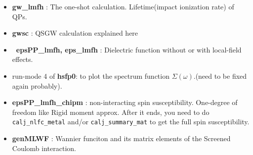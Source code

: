 {\begin{itemize}
\item
{\bf gw\_lmfh} : The one-shot \GW calculation. 
     Lifetime(impact ionization rate) of QPs.

\item
{\bf gwsc} : QSGW calculation explained here

\item
{\bf \ epsPP\_lmfh, eps\_lmfh} : Dielectric function without or with local-field effects.

\item
 run-mode 4 of {\bf hsfp0}: to plot the spectrum function
     $\Sigma(\omega)$.(need to be fixed again probably). 


\item
{\bf epsPP\_lmfh\_chipm} : non-interacting spin susceptibility. 
One-degree of freedom like Rigid moment approx.
After it ends, you need to do \verb#calj_nlfc_metal# and/or \verb#calj_summary_mat#
to get the full spin susceptibility.

\item
{\bf genMLWF} : Wannier funciton and its matrix elements of the Screened
     Coulomb interaction.

\end{itemize}






}
